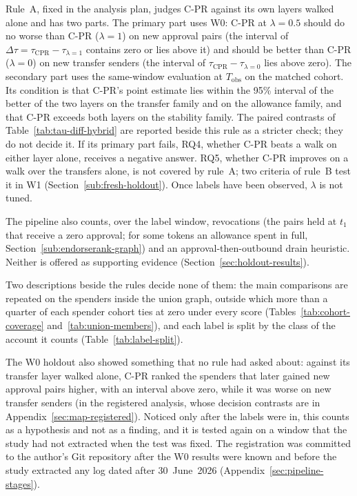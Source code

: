 Rule~A, fixed in the analysis plan, judges \mbox{C-PR} against its own layers walked alone and has two parts. The primary part uses W0: \mbox{C-PR} at $\lambda=0.5$ should do no worse than \mbox{C-PR} ($\lambda=1$) on new approval pairs (the interval of $\Delta\tau=\tau_{\mathrm{CPR}}-\tau_{\lambda=1}$ contains zero or lies above it) and should be better than \mbox{C-PR} ($\lambda=0$) on new transfer senders (the interval of $\tau_{\mathrm{CPR}}-\tau_{\lambda=0}$ lies above zero). The secondary part uses the same-window evaluation at $T_{\mathrm{obs}}$ on the matched cohort. Its condition is that \mbox{C-PR}'s point estimate lies within the 95\% interval of the better of the two layers on the transfer family and on the allowance family, and that \mbox{C-PR} exceeds both layers on the stability family. The paired contrasts of Table~\ref{tab:tau-diff-hybrid} are reported beside this rule as a stricter check; they do not decide it. If its primary part fails, RQ4, whether \mbox{C-PR} beats a walk on either layer alone, receives a negative answer. RQ5, whether \mbox{C-PR} improves on a walk over the transfers alone, is not covered by rule~A; two criteria of rule~B test it in W1 (Section~\ref{sub:fresh-holdout}). Once labels have been observed, $\lambda$ is not tuned.

The pipeline also counts, over the label window, revocations (the pairs held at $t_1$ that receive a zero approval; for some tokens an allowance spent in full, Section~\ref{sub:endorserank-graph}) and an approval-then-outbound drain heuristic. Neither is offered as supporting evidence (Section~\ref{sec:holdout-results}).

Two descriptions beside the rules decide none of them: the main comparisons are repeated on the spenders inside the union graph, outside which more than a quarter of each spender cohort ties at zero under every score (Tables~\ref{tab:cohort-coverage} and~\ref{tab:union-members}), and each label is split by the class of the account it counts (Table~\ref{tab:label-split}).


The W0 holdout also showed something that no rule had asked about: against its transfer layer walked alone, \mbox{C-PR} ranked the spenders that later gained new approval pairs higher, with an interval above zero, while it was worse on new transfer senders (in the registered analysis, whose decision contrasts are in Appendix~\ref{sec:map-registered}). Noticed only after the labels were in, this counts as a hypothesis and not as a finding, and it is tested again on a window that the study had not extracted when the test was fixed. The registration was committed to the author's Git repository after the W0 results were known and before the study extracted any log dated after 30~June~2026 (Appendix~\ref{sec:pipeline-stages}).

